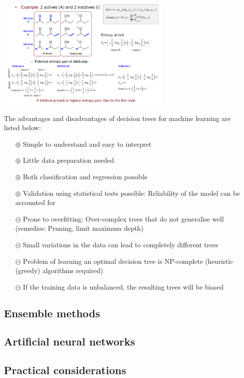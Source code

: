 
\begin{center}\includegraphics[width=0.65\textwidth]{img/machine/MachineDecisionTreesEntropyExample.png}\end{center}

The advantages and disadvantages of decision trees for machine learning are listed below:

\begin{itemize}
    \item[$\oplus$] Simple to understand and easy to interpret
    \item[$\oplus$] Little data preparation needed
    \item[$\oplus$] Both classification and regression possible
    \item[$\oplus$] Validation using statistical tests possible: Reliability of the model can be accounted for
    \item[$\ominus$] Prone to overfitting: Over-complex trees that do not generalise well (remedies: Pruning, limit maximum depth)
    \item[$\ominus$] Small variations in the data can lead to completely different trees
    \item[$\ominus$] Problem of learning an optimal decision tree is NP-complete (heuristic (greedy) algorithms required)
    \item[$\ominus$] If the training data is unbalanced, the resulting trees will be biased
\end{itemize}

\subsection{Ensemble methods}

\subsection{Artificial neural networks}

\subsection{Practical considerations}